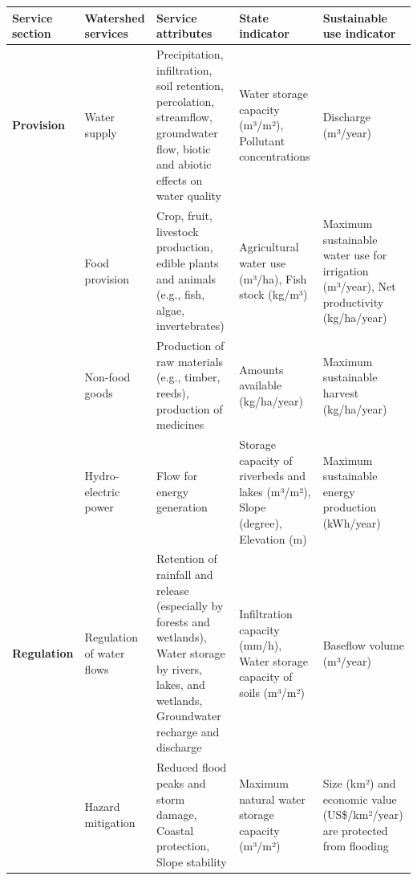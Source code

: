 \documentclass[./main_en.tex]{subfiles}
\begin{document}
{\renewcommand{\arraystretch}{1.5}
\begin{table}[t!]
    \centering	
    \tiny
    \sffamily
    \begin{tabular}{ 
        >{\raggedright\arraybackslash}m{1.5cm} 
        >{\raggedright\arraybackslash}m{2.5cm}  
        >{\raggedright\arraybackslash}m{3.0cm}  
        >{\raggedright\arraybackslash}m{2.5cm}
        >{\raggedright\arraybackslash}m{2.5cm}
    }
    \toprule 
    \textbf{Service section} & \textbf{Watershed services} & \textbf{Service attributes} & \textbf{State indicator} & \textbf{Sustainable use indicator} \\ 
    \midrule 
    \textbf{Provision} & Water supply & Precipitation, infiltration, soil retention, percolation, streamflow, groundwater flow, biotic and abiotic effects on water quality & Water storage capacity (m³/m²), Pollutant concentrations & Discharge (m³/year) \\ 
    
    \cline{2-5} 
     & Food provision & Crop, fruit, livestock production, edible plants and animals (e.g., fish, algae, invertebrates) & Agricultural water use (m³/ha), Fish stock (kg/m³) & Maximum sustainable water use for irrigation (m³/year), Net productivity (kg/ha/year) \\ 
    
    \cline{2-5}
     & Non-food goods & Production of raw materials (e.g., timber, reeds), production of medicines & Amounts available (kg/ha/year) & Maximum sustainable harvest (kg/ha/year) \\ 
    
    \cline{2-5} & Hydro-electric power & Flow for energy generation & Storage capacity of riverbeds and lakes (m³/m²), Slope (degree), Elevation (m) & Maximum sustainable energy production (kWh/year) \\ 
    
    \textbf{Regulation} & Regulation of water flows & Retention of rainfall and release (especially by forests and wetlands), Water storage by rivers, lakes, and wetlands, Groundwater recharge and discharge & Infiltration capacity (mm/h), Water storage capacity of soils (m³/m²) & Baseflow volume (m³/year) \\ 
    
    \cline{2-5}
    & Hazard mitigation & Reduced flood peaks and storm damage, Coastal protection, Slope stability & Maximum natural water storage capacity (m³/m²) & Size (km²) and economic value (US\$/km²/year) are protected from flooding \\ 
    

\end{tabular}
\end{table}}
\end{document}
